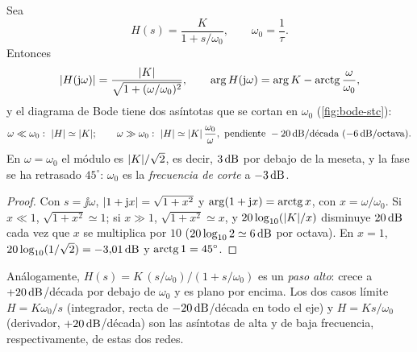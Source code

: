 \begin{proposicion}\label{prop:STC}
Sea
\begin{equation}\label{eq:STC}
  H(s)=\frac{K}{1+s/\omega_0},\qquad \omega_0=\frac1\tau .
\end{equation}
Entonces
\begin{equation}\label{eq:STC-modulo}
  \lvert H(\mathrm{j}\omega)\rvert=\frac{\lvert K\rvert}{\sqrt{1+(\omega/\omega_0)^{2}}},\qquad
  \arg H(\mathrm{j}\omega)=\arg K-\operatorname{arctg}\frac{\omega}{\omega_0},
\end{equation}
y el diagrama de Bode tiene dos asíntotas que se cortan en $\omega_0$ (\cref{fig:bode-stc}):
\begin{equation}\label{eq:STC-asintotas}
  \omega\ll\omega_0:\ \abs{H}\simeq\abs{K};\qquad
  \omega\gg\omega_0:\ \abs{H}\simeq\abs{K}\,\frac{\omega_0}{\omega},
  \ \text{pendiente }-20\dB/\text{década}\ (-6\dB/\text{octava}).
\end{equation}
En $\omega=\omega_0$ el módulo es $\lvert K\rvert/\sqrt2$, es decir, $3\,\mathrm{dB}$ por debajo de la meseta, y la fase
se ha retrasado $45^{\circ}$: $\omega_0$ es la \emph{frecuencia de corte} a $-3\,\mathrm{dB}$.
\end{proposicion}
\begin{proof}
Con $s=\jj\omega$, $\lvert 1+\mathrm{j} x\rvert=\sqrt{1+x^{2}}$ y $\arg(1+\mathrm{j} x)=\operatorname{arctg} x$, con $x=\omega/\omega_0$. Si $x\ll1$,
$\sqrt{1+x^{2}}\simeq1$; si $x\gg1$, $\sqrt{1+x^{2}}\simeq x$, y $20\log_{10}(\lvert K\rvert/x)$ disminuye
$20\,\mathrm{dB}$ cada vez que $x$ se multiplica por $10$ ($20\log_{10}2\simeq6\,\mathrm{dB}$ por octava). En $x=1$,
$20\log_{10}(1/\sqrt2)=-3{,}01\,\mathrm{dB}$ y $\operatorname{arctg}1=45^{\circ}$.
\end{proof}

Análogamente, $H(s)=K\,(s/\omega_0)/(1+s/\omega_0)$ es un \emph{paso alto}: crece a
$+20\,\mathrm{dB}$/década por debajo de $\omega_0$ y es plano por encima. Los dos casos límite
$H=K\omega_0/s$ (integrador, recta de $-20\,\mathrm{dB}$/década en todo el eje) y $H=Ks/\omega_0$
(derivador, $+20\,\mathrm{dB}$/década) son las asíntotas de alta y de baja frecuencia, respectivamente,
de estas dos redes.



